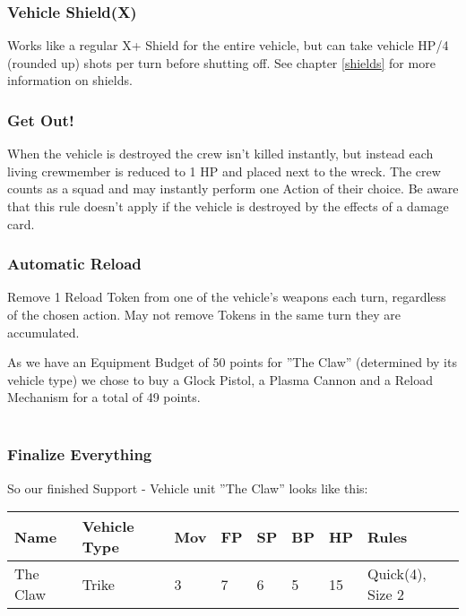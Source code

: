 \documentclass[
	11pt,
	toc=bibliography
	]{article}
\begin{document}
\subsubsection*{Vehicle Shield(X)}
Works like a regular X+ Shield for the entire vehicle, but can take vehicle HP/4 (rounded up) shots per turn before shutting off. See chapter \ref{shields} for more information on shields.

\subsubsection*{Get Out!}
When the vehicle is destroyed the crew isn't killed instantly, but instead each living crewmember is reduced to 1 HP and placed next to the wreck. The crew counts as a squad and may instantly perform one Action of their choice. Be aware that this rule doesn't apply if the vehicle is destroyed by the effects of a damage card.

\subsubsection*{Automatic Reload}
Remove 1 Reload Token from one of the vehicle's weapons each turn, regardless of the chosen action. May not remove Tokens in the same turn they are accumulated.

As we have an Equipment Budget of 50 points for ''The Claw'' (determined by its vehicle type) we chose to buy a Glock Pistol, a Plasma Cannon and a Reload Mechanism for a total of 49 points.\\\\

\subsubsection{Finalize Everything}
So our finished Support - Vehicle unit ''The Claw'' looks like this:
{\renewcommand{\arraystretch}{2}
\begin{longtable}{V{.2\textwidth}| V{.1\textwidth}V{.05\textwidth} V{.025\textwidth}V{.025\textwidth}V{.025\textwidth}V{.025\textwidth}V{.2\textwidth} }
\bf Name & \bf Vehicle Type & \bf Mov & \bf FP & \bf SP & \bf BP & \bf HP &\bf Rules\\ 
\hline 
The Claw & Trike & 3 & 7 & 6 & 5 & 15 & Quick(4), Size 2\\ 
\end{longtable}}
\end{document}

